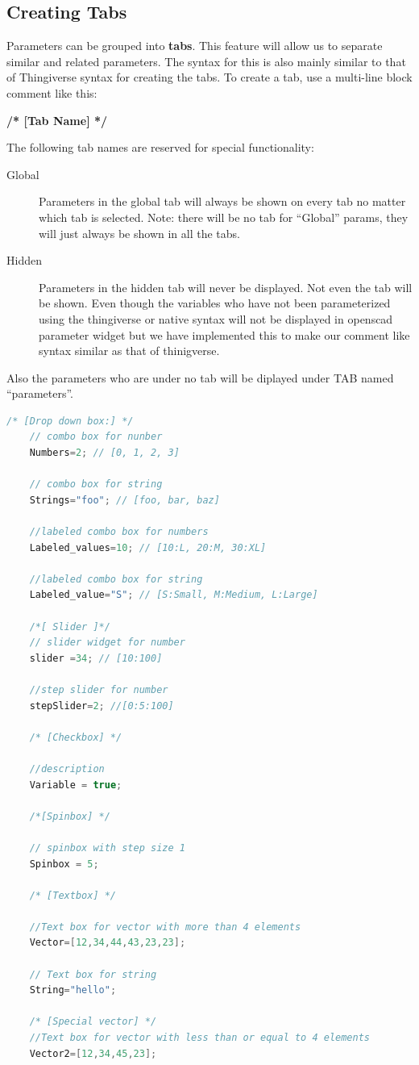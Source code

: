 \subsection{Creating Tabs}
Parameters can be grouped into \textbf{tabs}. This feature will allow us to separate similar and related parameters. The syntax for this is also mainly similar to that of Thingiverse syntax for creating the tabs. To create a tab, use a multi-line block comment like this:

\textbf{/* [Tab Name] */}

The following tab names are reserved for special functionality:
\begin{description}
\item [Global] Parameters in the global tab will always be shown on every tab no matter which tab is selected. Note: there will be no tab for “Global” params, they will just always be shown in all the tabs.

\item [Hidden] Parameters in the hidden tab will never be displayed. Not even the tab will be shown. Even though the variables who have not been parameterized using the thingiverse or native syntax will not be displayed in openscad parameter widget but we have implemented this to make our comment like syntax similar as that of thinigverse.
\end{description}

Also the parameters who are under no tab will be diplayed under TAB named “parameters”.
\begin{lstlisting}[language=c++]
	/* [Drop down box:] */
	// combo box for nunber
	Numbers=2; // [0, 1, 2, 3]
	
	// combo box for string
	Strings="foo"; // [foo, bar, baz]
	
	//labeled combo box for numbers
	Labeled_values=10; // [10:L, 20:M, 30:XL]
	
	//labeled combo box for string
	Labeled_value="S"; // [S:Small, M:Medium, L:Large]
	
	/*[ Slider ]*/
	// slider widget for number
	slider =34; // [10:100]
	
	//step slider for number
	stepSlider=2; //[0:5:100]
	
	/* [Checkbox] */
	
	//description
	Variable = true;
	
	/*[Spinbox] */
	
	// spinbox with step size 1
	Spinbox = 5; 
	
	/* [Textbox] */
	
	//Text box for vector with more than 4 elements
	Vector=[12,34,44,43,23,23];
	
	// Text box for string
	String="hello";
	
	/* [Special vector] */
	//Text box for vector with less than or equal to 4 elements
	Vector2=[12,34,45,23];
\end{lstlisting}

